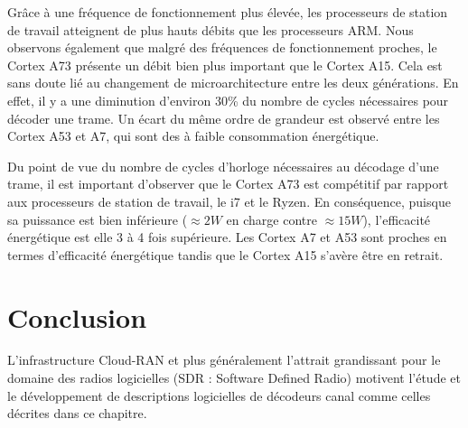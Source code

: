 Grâce à une fréquence de fonctionnement plus élevée, les processeurs de station de travail atteignent de plus hauts débits que les processeurs ARM. Nous observons également que malgré des fréquences de fonctionnement proches, le Cortex A73 présente un débit bien plus important que le Cortex A15. Cela est sans doute lié au changement de microarchitecture entre les deux générations. En effet, il y a une diminution d'environ 30\% du nombre de cycles nécessaires pour décoder une trame. Un écart du même ordre de grandeur est observé entre les Cortex A53 et A7, qui sont des \coeurs à faible consommation énergétique.

Du point de vue du nombre de cycles d'horloge nécessaires au décodage d'une trame, il est important d'observer que le Cortex A73 est compétitif par rapport aux processeurs de station de travail, le i7 et le Ryzen. En conséquence, puisque sa puissance est bien inférieure ($\approx 2 W$ en charge contre $\approx 15 W$), l'efficacité énergétique est elle 3 à 4 fois supérieure. Les Cortex A7 et A53 sont proches en termes d'efficacité énergétique tandis que le Cortex A15 s'avère être en retrait.



\section{Conclusion}

L'infrastructure Cloud-RAN et plus généralement l'attrait grandissant pour le domaine des radios logicielles (SDR : Software Defined Radio) motivent l'étude et le développement de descriptions logicielles de décodeurs canal comme celles décrites dans ce chapitre.

